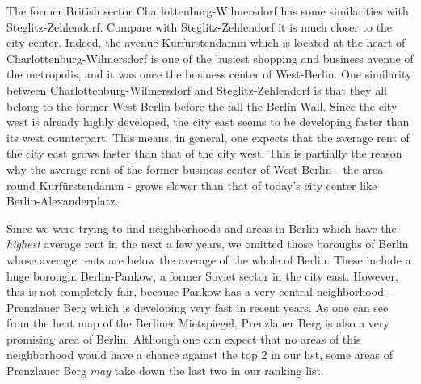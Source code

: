 \documentclass[11pt]{article}
\begin{document}
The former British sector Charlottenburg-Wilmersdorf has some
similarities with Steglitz-Zehlendorf. Compare with Steglitz-Zehlendorf
it is much closer to the city center. Indeed, the avenue Kurfürstendamm
which is located at the heart of Charlottenburg-Wilmersdorf is one of
the busiest shopping and business avenue of the metropolis, and it was
once the business center of West-Berlin. One similarity between
Charlottenburg-Wilmersdorf and Steglitz-Zehlendorf is that they all
belong to the former West-Berlin before the fall the Berlin Wall. Since
the city west is already highly developed, the city east seems to be
developing faster than its west counterpart. This means, in general, one
expects that the average rent of the city east grows faster than that of
the city west. This is partially the reason why the average rent of the
former business center of West-Berlin - the area round Kurfürstendamm -
grows slower than that of today's city center like
Berlin-Alexanderplatz.

Since we were trying to find neighborhoods and areas in Berlin which
have the \emph{highest} average rent in the next a few years, we omitted
those boroughs of Berlin whose average rents are below the average of
the whole of Berlin. These include a huge borough: Berlin-Pankow, a
former Soviet sector in the city east. However, this is not completely
fair, because Pankow has a very central neighborhood - Prenzlauer Berg
which is developing very fast in recent years. As one can see from the
heat map of the Berliner Mietspiegel, Prenzlauer Berg is also a very
promising area of Berlin. Although one can expect that no areas of this
neighborhood would have a chance against the top 2 in our list, some
areas of Prenzlauer Berg \emph{may} take down the last two in our
ranking list.
\end{document}

